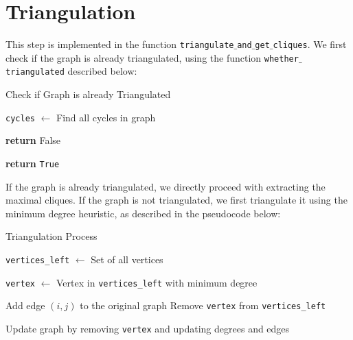 \documentclass[a4paper,12pt]{article}
\title{\cooltitle{CS726 Programming Assignment -- 1 Report}}
\author{
\textbf{Saksham Rathi (22B1003)}\\
\textbf{Sharvanee Sonawane (22B0943)}\\
\textbf{Deeksha Dhiwakar (22B0988)}\\
\small Department of Computer Science, \\
Indian Institute of Technology Bombay \\}
\date{}
\begin{document}
\maketitle

\section{Triangulation}
This step is implemented in the function \texttt{triangulate}$\_$\texttt{and}$\_$\texttt{get}$\_$\texttt{cliques}. We first check if the graph is already triangulated, using the function \texttt{whether}$\_$\texttt{triangulated} described below:
\begin{algorithm}
\caption{Check if Graph is already Triangulated}
\begin{algorithmic}[1]

    \State \texttt{cycles} $\gets$ Find all cycles in graph


                \State \textbf{return} False
            \EndIf
        \EndIf
    \EndFor

        \State \textbf{return} \texttt{True}
\end{algorithmic}
\end{algorithm}


If the graph is already triangulated, we directly proceed with extracting the maximal cliques. If the graph is not triangulated, we first triangulate it using the minimum degree heuristic, as described in the pseudocode below:

\begin{algorithm}
\caption{Triangulation Process}
\begin{algorithmic}[1]

    \State \texttt{vertices\_left} $\gets$ Set of all vertices



        \State \texttt{vertex} $\gets$ Vertex in \texttt{vertices\_left} with minimum degree

                \State Add edge $(i, j)$ to the original graph
            \EndIf
        \EndFor
        \State Remove \texttt{vertex} from \texttt{vertices\_left}

        \State Update graph by removing \texttt{vertex} and updating degrees and edges
    \EndWhile
\end{algorithmic}
\end{algorithm}
\end{document}
